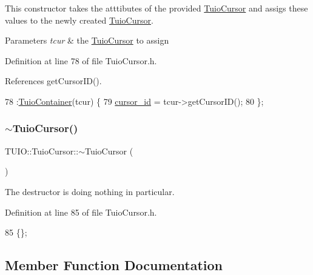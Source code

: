 This constructor takes the atttibutes of the provided \hyperlink{class_t_u_i_o_1_1_tuio_cursor}{Tuio\+Cursor} and assigs these values to the newly created \hyperlink{class_t_u_i_o_1_1_tuio_cursor}{Tuio\+Cursor}.


\begin{DoxyParams}{Parameters}
{\em tcur} & the \hyperlink{class_t_u_i_o_1_1_tuio_cursor}{Tuio\+Cursor} to assign \\
\hline
\end{DoxyParams}


Definition at line 78 of file Tuio\+Cursor.\+h.



References get\+Cursor\+I\+D().


\begin{DoxyCode}
78                                      :\hyperlink{class_t_u_i_o_1_1_tuio_container_a970e6fa8eefc231dccf75d11b68c289d}{TuioContainer}(tcur) \{
79             \hyperlink{class_t_u_i_o_1_1_tuio_cursor_a6ce31b46c0bb528acc3be28e5dd1e278}{cursor\_id} = tcur->getCursorID();
80         \};
\end{DoxyCode}
\mbox{\label{class_t_u_i_o_1_1_tuio_cursor_ab791383734f2121d7bc217c108213e36}} 
\subsubsection{\texorpdfstring{$\sim$\+Tuio\+Cursor()}{~TuioCursor()}}
{\footnotesize\ttfamily T\+U\+I\+O\+::\+Tuio\+Cursor\+::$\sim$\+Tuio\+Cursor (\begin{DoxyParamCaption}{ }\end{DoxyParamCaption})\hspace{0.3cm}{\ttfamily [inline]}}

The destructor is doing nothing in particular. 

Definition at line 85 of file Tuio\+Cursor.\+h.


\begin{DoxyCode}
85 \{\};
\end{DoxyCode}


\subsection{Member Function Documentation}
\mbox{\label{class_t_u_i_o_1_1_tuio_cursor_a3e8ee1381e61eb54c7563e10a2fafb0b}} 
